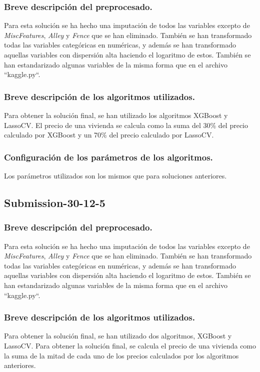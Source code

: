 	\subsubsection{Breve descripción del preprocesado.}
	Para esta solución se ha hecho una imputación de todos las variables excepto de \textit{MiscFeatures}, \textit{Alley} y \textit{Fence} que se han eliminado. También se han transformado todas las variables categóricas en numéricas, y además se han transformado aquellas variables con dispersión alta haciendo el logaritmo de estos. También se han estandarizado algunas variables de la misma forma que en el archivo ``kaggle.py``.
	\subsubsection{Breve descripción de los algoritmos utilizados.}
		Para obtener la solución final, se han utilizado los algoritmos XGBoost y LassoCV. El precio de una vivienda se calcula como la suma del 30\% del precio calculado por XGBoost y un 70\% del precio calculado por LassoCV.
	\subsubsection{Configuración de los parámetros de los algoritmos.}
	Los parámetros utilizados son los mismos que para soluciones anteriores.
	
	\subsection{Submission-30-12-5}
	\subsubsection{Breve descripción del preprocesado.}
	Para esta solución se ha hecho una imputación de todos las variables excepto de \textit{MiscFeatures}, \textit{Alley} y \textit{Fence} que se han eliminado. También se han transformado todas las variables categóricas en numéricas, y además se han transformado aquellas variables con dispersión alta haciendo el logaritmo de estos. También se han estandarizado algunas variables de la misma forma que en el archivo ``kaggle.py``.
	\subsubsection{Breve descripción de los algoritmos utilizados.}
		Para obtener la solución final, se han utilizado dos algoritmos, XGBoost y LassoCV. Para obtener la solución final, se calcula el precio de una vivienda como la suma de la mitad de cada uno de los precios calculados por los algoritmos anteriores.

